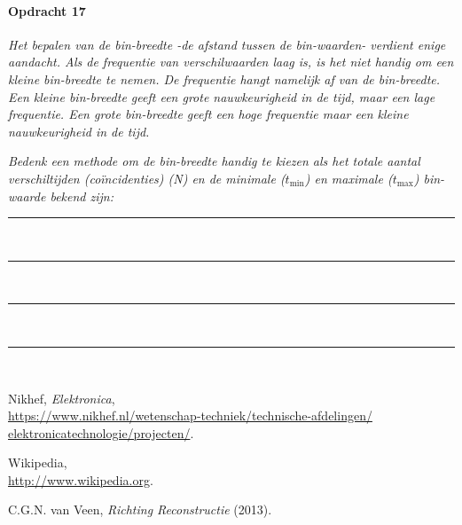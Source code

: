 \bigskip{}


\begin{minipage}[t]{1\columnwidth}

\paragraph{Opdracht 17}

\textit{Het bepalen van de bin-breedte -de afstand tussen de bin-waarden-
verdient enige aandacht. Als de frequentie van verschilwaarden laag
is, is het niet handig om een kleine bin-breedte te nemen. De frequentie
hangt namelijk af van de bin-breedte. Een kleine bin-breedte geeft
een grote nauwkeurigheid in de tijd, maar een lage frequentie. Een
grote bin-breedte geeft een hoge frequentie maar een kleine nauwkeurigheid
in de tijd.}

\textit{Bedenk een methode om de bin-breedte handig te kiezen als
het totale aantal verschiltijden (coïncidenties) (N) en de minimale
($t_\textrm{min}$) en maximale ($t_\textrm{max}$) bin-waarde bekend zijn:}

\begin{center}
    \rule{\textwidth}{0.3mm}\\
    \rule{\textwidth}{0.3mm}\\
    \rule{\textwidth}{0.3mm}\\
    \rule{\textwidth}{0.3mm}\\
\end{center}
\end{minipage}


\begin{thebibliography}{9}
     Nikhef, \emph{\hisparc Elektronica},\\
    \url{https://www.nikhef.nl/wetenschap-techniek/technische-afdelingen/
	  elektronicatechnologie/projecten/}.

     Wikipedia, \\
    \url{http://www.wikipedia.org}.

     C.G.N. van Veen, \emph{Richting
    Reconstructie} (2013).
\end{thebibliography}


